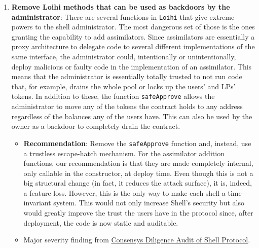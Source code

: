 \begin{enumerate}
\item\textbf{Remove Loihi methods that can be used as backdoors by the administrator}: There are several functions in \verb|Loihi| that give extreme powers to the shell administrator. The most dangerous set of those is the ones granting the capability to add assimilators. Since assimilators are essentially a proxy architecture to delegate code to several different implementations of the same interface, the administrator could, intentionally or unintentionally, deploy malicious or faulty code in the implementation of an assimilator. This means that the administrator is essentially totally trusted to not run code that, for example, drains the whole pool or locks up the users’ and LPs’ tokens. In addition to these, the function \verb|safeApprove| allows the administrator to move any of the tokens the contract holds to any address regardless of the balances any of the users have. This can also be used by the owner as a backdoor to completely drain the contract.
	\begin{itemize}
	\item\textbf{Recommendation}: Remove the \verb|safeApprove| function and, instead, use a trustless escape-hatch mechanism. For the assimilator addition functions, our recommendation is that they are made completely internal, only callable in the constructor, at deploy time. Even though this is not a big structural change (in fact, it reduces the attack surface), it is, indeed, a feature loss. However, this is the only way to make each shell a time-invariant system. This would not only increase Shell’s security but also would greatly improve the trust the users have in the protocol since, after deployment, the code is now static and auditable.
	\item Major severity finding from \href{https://consensys.net/diligence/audits/2020/06/shell-protocol/\#remove-loihi-methods-that-can-be-used-as-backdoors-by-the-administrator}{Consensys Diligence Audit of Shell Protocol}.
	\end{itemize}


\end{enumerate}
